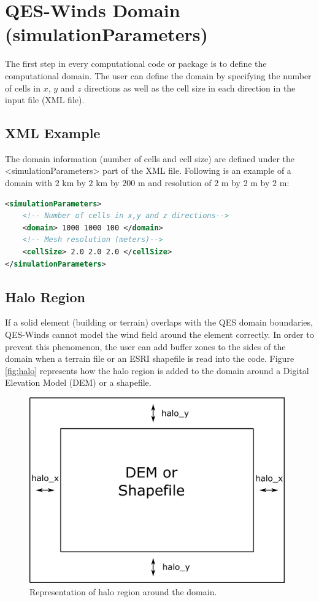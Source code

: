\section{QES-Winds Domain (simulationParameters)}

The first step in every computational code or package is to define the computational domain. The user can define the domain by specifying the number of cells in $x$, $y$ and $z$ directions as well as the cell size in each direction in the input file (XML file).

\subsection{XML Example}

The domain information (number of cells and cell size) are defined under the <simulationParameters> part of the XML file. Following is an example of a domain with $2$ km by $2$ km by $200$ m and resolution of $2$ m by $2$ m by $2$ m:

\begin{lstlisting}[language=XML]
<simulationParameters>
	<!-- Number of cells in x,y and z directions-->
  	<domain> 1000 1000 100 </domain>	
  	<!-- Mesh resolution (meters)-->				
  	<cellSize> 2.0 2.0 2.0 </cellSize> 				
</simulationParameters>
\end{lstlisting}

\subsection{Halo Region}

If a solid element (building or terrain) overlaps with the QES domain boundaries, QES-Winds cannot model the wind field around the element correctly. In order to prevent this phenomenon, the user can add buffer zones to the sides of the domain when a terrain file or an ESRI shapefile is read into the code. Figure \ref{fig:halo} represents how the halo region is added to the domain around a Digital Elevation Model (DEM) or a shapefile.

\begin{figure}[h!]
\centering
\includegraphics[width=11.0cm,keepaspectratio]{Images/domain_halo.png}
\caption{Representation of halo region around the domain.}
\end{figure}

